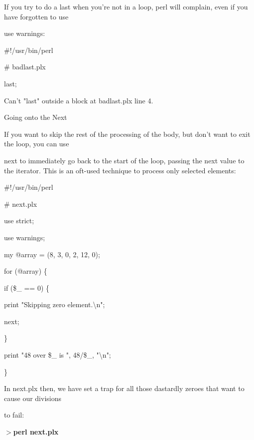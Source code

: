 \documentclass[a4paper,11pt]{book}
\begin{document}
\noindent If you try to do a last when you're not in a loop, perl will complain, even if you have forgotten to use

\noindent use warnings:

\noindent 

\noindent \#!/usr/bin/perl

\noindent \# badlast.plx

\noindent 

\noindent last;

\noindent 

\noindent Can't "last" outside a block at badlast.plx line 4.

\noindent 

\noindent 

\noindent Going onto the Next

\noindent 

\noindent If you want to skip the rest of the processing of the body, but don't want to exit the loop, you can use

\noindent next to immediately go back to the start of the loop, passing the next value to the iterator. This is an oft-used technique to process only selected elements:

\noindent 

\noindent \#!/usr/bin/perl

\noindent \# next.plx

\noindent use strict;

\noindent use warnings;

\noindent 

\noindent my @array = (8, 3, 0, 2, 12, 0);

\noindent for (@array) \{

\noindent if (\$\_  == 0) \{

\noindent print "Skipping zero element.\textbackslash n";

\noindent next;

\noindent \}

\noindent print "48 over \$\_  is ", 48/\$\_, "\textbackslash n";

\noindent \}

\noindent 

\noindent In  next.plx then,  we have set  a  trap  for  all  those  dastardly  zeroes  that  want  to  cause  our  divisions

\noindent to fail:

\noindent 

\noindent $>$\textbf{perl next.plx}
\end{document}
